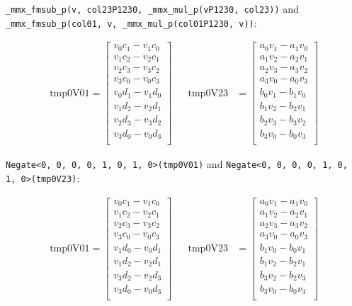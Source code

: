 \documentclass[]{scrartcl}
\begin{document}
\texttt{_mmx_fmsub_p(v, col23P1230, _mmx_mul_p(vP1230, col23))} and \newline \texttt{_mmx_fmsub_p(col01, v, _mmx_mul_p(col01P1230, v))}:

\begin{align*}
\mathrm{tmp0V01} 
=
\begin{bmatrix}
v_0c_1 - v_1c_0\\
v_1c_2 - v_2c_1\\
v_2c_3 - v_3c_2\\
v_3c_0 - v_0c_3\\
v_0d_1 - v_1d_0\\
v_1d_2 - v_2d_1\\
v_2d_3 - v_3d_2\\
v_3d_0 - v_0d_3\\
\end{bmatrix}
&&
\mathrm{tmp0V23} 
&=
\begin{bmatrix}
a_0v_1 - a_1v_0\\
a_1v_2 - a_2v_1\\
a_2v_3 - a_3v_2\\
a_3v_0 - a_0v_3\\
b_0v_1 - b_1v_0\\
b_1v_2 - b_2v_1\\
b_2v_3 - b_3v_2\\
b_3v_0 - b_0v_3\\
\end{bmatrix}
\end{align*}

\texttt{Negate<0, 0, 0, 0, 1, 0, 1, 0>(tmp0V01)} and \newline \texttt{Negate<0, 0, 0, 0, 1, 0, 1, 0>(tmp0V23)}: 

\begin{align*}
\mathrm{tmp0V01} 
=
\begin{bmatrix}
v_0c_1 - v_1c_0\\
v_1c_2 - v_2c_1\\
v_2c_3 - v_3c_2\\
v_3c_0 - v_0c_3\\
v_1d_0 - v_0d_1\\
v_1d_2 - v_2d_1\\
v_3d_2 - v_2d_3\\
v_3d_0 - v_0d_3\\
\end{bmatrix}
&&
\mathrm{tmp0V23} 
&=
\begin{bmatrix}
a_0v_1 - a_1v_0\\
a_1v_2 - a_2v_1\\
a_2v_3 - a_3v_2\\
a_3v_0 - a_0v_3\\
b_1v_0 - b_0v_1\\
b_1v_2 - b_2v_1\\
b_3v_2 - b_2v_3\\
b_3v_0 - b_0v_3\\
\end{bmatrix}
\end{align*}
\end{document}
